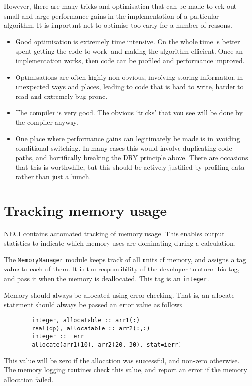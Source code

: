 \documentclass[a4paper,notitlepage,dvipsnames]{scrreprt}
\let\code\lstinline
\begin{document}
	However, there are many tricks and optimisation that can be made to
	eek out small and large performance gains in the implementation of a
	particular algorithm. It is important not to optimise too early for a
	number of reasons.
	\begin{itemize}
		\item
			Good optimisation is extremely time intensive. On the whole time
			is better spent getting the code to work, and making the
			algorithm efficient. Once an implementation works, then code can
			be profiled and performance improved.
		\item
			Optimisations are often highly non-obvious, involving storing
			information in unexpected ways and places, leading to code that
			is hard to write, harder to read and extremely bug prone.
		\item
			The compiler is very good. The obvious `tricks' that you see will
			be done by the compiler anyway.
		\item
			One place where performance gains can legitimately be made is in
			avoiding conditional switching. In many cases this would involve
			duplicating code paths, and horrifically breaking the DRY
			principle above. There are occasions that this is worthwhile, but
			this should be actively justified by profiling data rather than
			just a hunch.
	\end{itemize}

\section{Tracking memory usage}
	NECI contains automated tracking of memory usage. This enables output
	statistics to indicate which memory uses are dominating during a
	calculation.

	The \code{MemoryManager} module keeps track of all units of memory, and
	assigns a tag value to each of them. It is the responsibility of the
	developer to store this tag, and pass it when the memory is deallocated.
	This tag is an \code{integer}.

	Memory should always be allocated using error checking. That is, an
	allocate statement should always be passed an error value as follows
	\begin{lstlisting}
		integer, allocatable :: arr1(:)
		real(dp), allocatable :: arr2(:,:)
		integer :: ierr
		allocate(arr1(10), arr2(20, 30), stat=ierr)
	\end{lstlisting}
	This value will be zero if the allocation was successful, and non-zero
	otherwise. The memory logging routines check this value, and report an
	error if the memory allocation failed.
\end{document}
